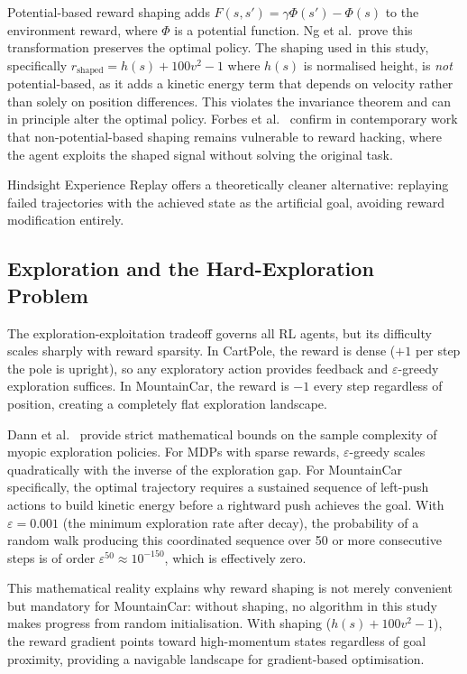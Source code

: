 \documentclass[a4paper,12pt]{article}
\begin{document}
Potential-based reward shaping \cite{ng1999policy} adds $F(s,s') = \gamma\Phi(s') - \Phi(s)$ to the environment reward, where $\Phi$ is a potential function. Ng et al.\ prove this transformation preserves the optimal policy. The shaping used in this study, specifically $r_{\text{shaped}} = h(s) + 100v^2 - 1$ where $h(s)$ is normalised height, is \emph{not} potential-based, as it adds a kinetic energy term that depends on velocity rather than solely on position differences. This violates the invariance theorem and can in principle alter the optimal policy. Forbes et al.\ \cite{forbes2025adops} confirm in contemporary work that non-potential-based shaping remains vulnerable to reward hacking, where the agent exploits the shaped signal without solving the original task.

Hindsight Experience Replay \cite{andrychowicz2017hindsight} offers a theoretically cleaner alternative: replaying failed trajectories with the achieved state as the artificial goal, avoiding reward modification entirely.

\subsection{Exploration and the Hard-Exploration Problem}

The exploration-exploitation tradeoff governs all RL agents, but its difficulty scales sharply with reward sparsity. In CartPole, the reward is dense ($+1$ per step the pole is upright), so any exploratory action provides feedback and $\varepsilon$-greedy exploration suffices. In MountainCar, the reward is $-1$ every step regardless of position, creating a completely flat exploration landscape.

Dann et al.\ \cite{dann2022exploration} provide strict mathematical bounds on the sample complexity of myopic exploration policies. For MDPs with sparse rewards, $\varepsilon$-greedy scales quadratically with the inverse of the exploration gap. For MountainCar specifically, the optimal trajectory requires a sustained sequence of left-push actions to build kinetic energy before a rightward push achieves the goal. With $\varepsilon = 0.001$ (the minimum exploration rate after decay), the probability of a random walk producing this coordinated sequence over 50 or more consecutive steps is of order $\varepsilon^{50} \approx 10^{-150}$, which is effectively zero.

This mathematical reality explains why reward shaping is not merely convenient but mandatory for MountainCar: without shaping, no algorithm in this study makes progress from random initialisation. With shaping ($h(s) + 100v^2 - 1$), the reward gradient points toward high-momentum states regardless of goal proximity, providing a navigable landscape for gradient-based optimisation.
\end{document}
